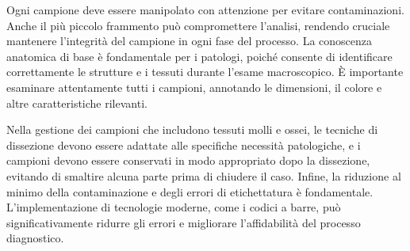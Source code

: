 Ogni campione deve essere manipolato con attenzione per evitare contaminazioni. Anche il più piccolo frammento può compromettere l’analisi, rendendo cruciale mantenere l'integrità del campione in ogni fase del processo. La conoscenza anatomica di base è fondamentale per i patologi, poiché consente di identificare correttamente le strutture e i tessuti durante l’esame macroscopico. È importante esaminare attentamente tutti i campioni, annotando le dimensioni, il colore e altre caratteristiche rilevanti.

Nella gestione dei campioni che includono tessuti molli e ossei, le tecniche di dissezione devono essere adattate alle specifiche necessità patologiche, e i campioni devono essere conservati in modo appropriato dopo la dissezione, evitando di smaltire alcuna parte prima di chiudere il caso. Infine, la riduzione al minimo della contaminazione e degli errori di etichettatura è fondamentale. L'implementazione di tecnologie moderne, come i codici a barre, può significativamente ridurre gli errori e migliorare l'affidabilità del processo diagnostico.